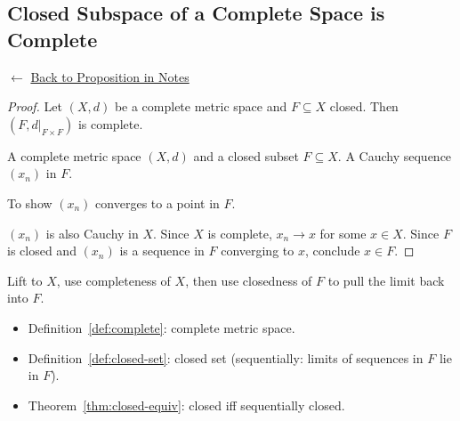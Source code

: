 
\subsection*{Closed Subspace of a Complete Space is Complete}
\label{prf:closed-subspace-complete}

\begin{remark*}[Return]
$\leftarrow$ \hyperref[prop:closed-subspace-complete]{Back to Proposition in Notes}
\end{remark*}

\begin{proof}
\Claim Let $(X,d)$ be a complete metric space and $F \subseteq X$ closed.
Then $(F, d|_{F \times F})$ is complete.

\Given A complete metric space $(X,d)$ and a closed subset $F \subseteq X$.
A Cauchy sequence $(x_n)$ in $F$.

\Goal To show $(x_n)$ converges to a point in $F$.

\Strategy $(x_n)$ is also Cauchy in $X$. Since $X$ is complete, $x_n \to x$
for some $x \in X$. Since $F$ is closed and $(x_n)$ is a sequence in $F$
converging to $x$, conclude $x \in F$.


\end{proof}

\begin{remark*}
Lift to $X$, use completeness of $X$, then use closedness of $F$
to pull the limit back into $F$.
\end{remark*}

\begin{remark*}[Dependencies]
\begin{itemize}
  \item Definition~\ref{def:complete}: complete metric space.
  \item Definition~\ref{def:closed-set}: closed set (sequentially: limits of sequences
        in $F$ lie in $F$).
  \item Theorem~\ref{thm:closed-equiv}: closed iff sequentially closed.
\end{itemize}
\end{remark*}
